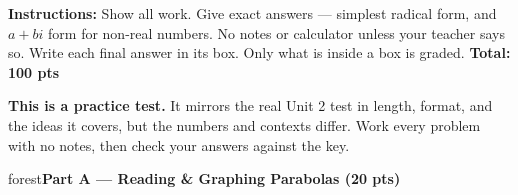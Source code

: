 \documentclass[12pt]{article}
\newcommand{\parthead}[1]{%
  \boxguard[10]\vspace{6pt}\noindent
  \begin{headlinebox}{forest}\color{white}\bfseries #1\end{headlinebox}%
  \vspace{4pt}}
\begin{document}

\vspace{0.06in}
\noindent\textbf{Instructions:} Show all work. Give exact answers --- simplest radical form, and
$a+bi$ form for non-real numbers. No notes or calculator unless your teacher says so.
Write each final answer in its box. Only what is inside a box is graded. \hfill\textbf{Total: 100 pts}

\vspace{4pt}
\boxguard[6]
\begin{remindbox}
\small
\textbf{This is a practice test.} It mirrors the real Unit 2 test in length, format, and the
ideas it covers, but the numbers and contexts differ. Work every problem with no notes, then check
your answers against the key.
\end{remindbox}

\parthead{Part A --- Reading \& Graphing Parabolas (20 pts)}
\end{document}
